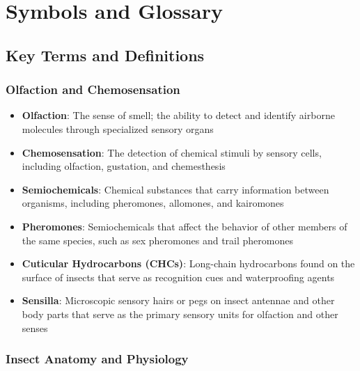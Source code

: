 \documentclass[
  13pt,
  a4paperpaper,
  12pt]{article}
\author{}
\date{}
\providecommand{\tightlist}{%
  \setlength{\itemsep}{0pt}\setlength{\parskip}{0pt}}
\let\oldsection\section
\renewcommand{\section}{\clearpage\oldsection}
\begin{document}
{
\hypersetup{linkcolor=black}
\setcounter{tocdepth}{3}
\tableofcontents
}
\section{Symbols and Glossary}\label{sec:symbols_glossary}

\subsection{Key Terms and Definitions}\label{key-terms-and-definitions}

\subsubsection{Olfaction and
Chemosensation}\label{olfaction-and-chemosensation}

\begin{itemize}
\tightlist
\item
  \textbf{Olfaction}: The sense of smell; the ability to detect and
  identify airborne molecules through specialized sensory organs
\item
  \textbf{Chemosensation}: The detection of chemical stimuli by sensory
  cells, including olfaction, gustation, and chemesthesis
\item
  \textbf{Semiochemicals}: Chemical substances that carry information
  between organisms, including pheromones, allomones, and kairomones
\item
  \textbf{Pheromones}: Semiochemicals that affect the behavior of other
  members of the same species, such as sex pheromones and trail
  pheromones
\item
  \textbf{Cuticular Hydrocarbons (CHCs)}: Long-chain hydrocarbons found
  on the surface of insects that serve as recognition cues and
  waterproofing agents
\item
  \textbf{Sensilla}: Microscopic sensory hairs or pegs on insect
  antennae and other body parts that serve as the primary sensory units
  for olfaction and other senses
\end{itemize}

\subsubsection{Insect Anatomy and
Physiology}\label{insect-anatomy-and-physiology}
\end{document}
